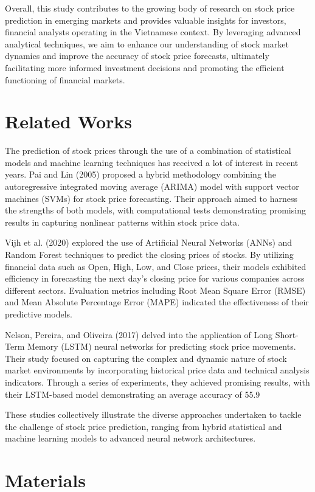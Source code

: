 \documentclass{ieeeojies}
\begin{document}
Overall, this study contributes to the growing body of research on stock price prediction in emerging markets and provides valuable insights for investors, financial analysts operating in the Vietnamese context. By leveraging advanced analytical techniques, we aim to enhance our understanding of stock market dynamics and improve the accuracy of stock price forecasts, ultimately facilitating more informed investment decisions and promoting the efficient functioning of financial markets.
\section{Related Works}
The prediction of stock prices through the use of a combination of statistical models and machine learning techniques has received a lot of interest in recent years. Pai and Lin (2005) \cite{b1} proposed a hybrid methodology combining the autoregressive integrated moving average (ARIMA) model with support vector machines (SVMs) for stock price forecasting. Their approach aimed to harness the strengths of both models, with computational tests demonstrating promising results in capturing nonlinear patterns within stock price data.

Vijh et al. (2020) \cite{b2} explored the use of Artificial Neural Networks (ANNs) and Random Forest techniques to predict the closing prices of stocks. By utilizing financial data such as Open, High, Low, and Close prices, their models exhibited efficiency in forecasting the next day's closing price for various companies across different sectors. Evaluation metrics including Root Mean Square Error (RMSE) and Mean Absolute Percentage Error (MAPE) indicated the effectiveness of their predictive models.

Nelson, Pereira, and Oliveira (2017) \cite{b3} delved into the application of Long Short-Term Memory (LSTM) neural networks for predicting stock price movements. Their study focused on capturing the complex and dynamic nature of stock market environments by incorporating historical price data and technical analysis indicators. Through a series of experiments, they achieved promising results, with their LSTM-based model demonstrating an average accuracy of 55.9%

These studies collectively illustrate the diverse approaches undertaken to tackle the challenge of stock price prediction, ranging from hybrid statistical and machine learning models to advanced neural network architectures.
\section{Materials}
\end{document}
